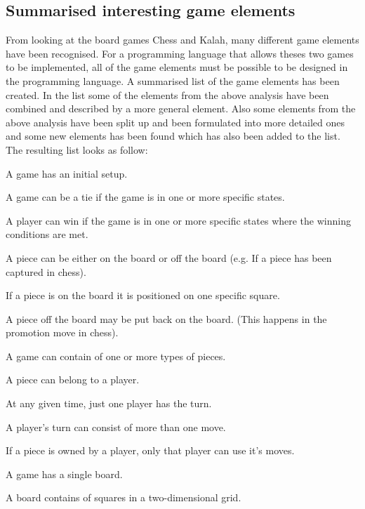 \subsection{Summarised interesting game elements}
\label{subsec:differences}

From looking at the board games Chess and Kalah, many different game elements have been recognised. For a programming language that allows theses two games to be implemented, all of the game elements must be possible to be designed in the programming language. A summarised list of the game elements has been created. In the list some of the elements from the above analysis have been combined and described by a more general element. Also some elements from the above analysis have been split up and been formulated into more detailed ones and some new elements has been found which has also been added to the list. The resulting list looks as follow:  

\begin{dlist}
  	\item A game has an initial setup.
  	\item A game can be a tie if the game is in one or more specific states.
  	\item A player can win if the game is in one or more specific states where the winning conditions are met.
  	\item A piece can be either on the board or off the board (e.g. If a piece has been captured in chess).
  		\begin{dlist}
  			\item If a piece is on the board it is positioned on one specific square.
  			\item A piece off the board may be put back on the board. (This happens in the promotion move in chess).
  		\end{dlist}
  	\item A game can contain of one or more types of pieces.
  	\item A piece can belong to a player.
  	\item At any given time, just one player has the turn.
  	\item A player's turn can consist of more than one move.
  	\item If a piece is owned by a player, only that player can use it's moves.
  	\item A game has a single board.
  	\item A board contains of squares in a two-dimensional grid.
\end{dlist}

